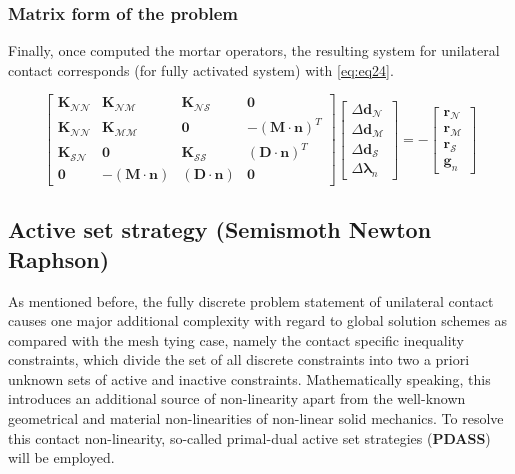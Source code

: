 \documentclass[a4paper,10pt]{article} %
\begin{document}
\subsubsection{Matrix form of the problem}


Finally, once computed the mortar operators, the resulting system for unilateral contact corresponds (for fully activated system) with \eqref{eq:eq24}.

\begin{equation}\label{eq:eq24}
 \left[ \begin{array}{cccc} \mathbf{K}_{\mathcal{N}\mathcal{N}} &  \mathbf{K}_{\mathcal{N}\mathcal{M}} & \mathbf{K}_{\mathcal{N}\mathcal{S}} & \mathbf{0} \\ \mathbf{K}_{\mathcal{N}\mathcal{N}}  & \mathbf{K}_{\mathcal{M}\mathcal{M}} & \mathbf{0} & -(\mathbf{M}\cdot \mathbf{n})^{T} \\ \mathbf{K}_{\mathcal{S}\mathcal{N}} & \mathbf{0} & \mathbf{K}_{\mathcal{S}\mathcal{S}} & (\mathbf{D}\cdot \mathbf{n})^T \\ \mathbf{0} & -(\mathbf{M}\cdot \mathbf{n}) & (\mathbf{D}\cdot \mathbf{n}) & \mathbf{0}   \end{array} \right] \left[ \begin{array}{c} \Delta\mathbf{d}_{\mathcal{N}} \\ \Delta\mathbf{d}_{\mathcal{M}} \\ \Delta\mathbf{d}_{\mathcal{S}} \\ \Delta\boldsymbol{\lambda}_n \end{array} \right] = - \left[ \begin{array}{c} \mathbf{r}_{\mathcal{N}} \\ \mathbf{r}_{\mathcal{M}} \\ \mathbf{r}_{\mathcal{S}} \\ \mathbf{g}_n \end{array} \right] 
\end{equation}

\subsection{Active set strategy (Semismoth Newton Raphson)}

As mentioned before, the fully discrete problem statement of unilateral contact causes one major additional complexity with regard to global solution schemes as compared with the mesh tying case, namely the contact specific inequality constraints, which divide the set of all discrete constraints into two a priori unknown sets of active and inactive constraints. Mathematically speaking, this introduces an additional source of non-linearity apart from the well-known geometrical and material non-linearities of non-linear solid mechanics. To resolve this contact non-linearity, so-called primal-dual active set strategies (\textbf{PDASS}) will be employed.
\end{document}
